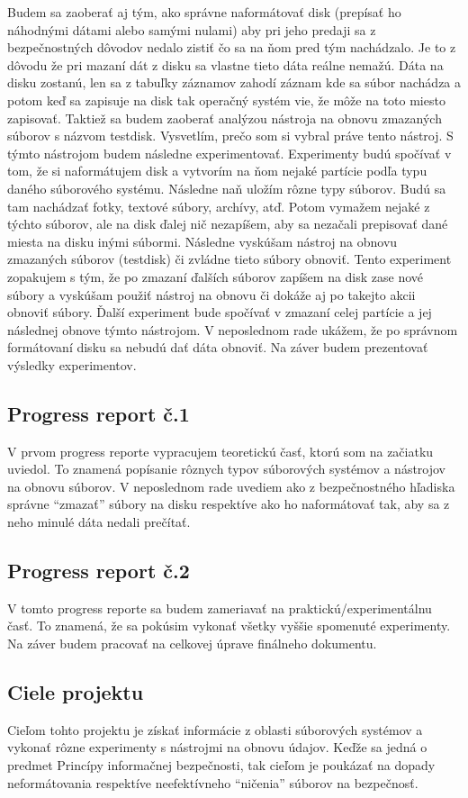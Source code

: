 \documentclass[12pt,oneside,slovak,a4paper]{article}
\begin{document}
Budem sa zaoberať aj tým, ako správne naformátovať disk (prepísať ho náhodnými dátami alebo samými nulami) aby pri jeho predaji sa z bezpečnostných dôvodov nedalo zistiť čo sa na ňom pred tým nachádzalo. Je to z dôvodu že pri mazaní dát z disku sa vlastne tieto dáta reálne nemažú. Dáta na disku zostanú, len sa z tabuľky záznamov zahodí záznam kde sa súbor nachádza a potom keď sa zapisuje na disk tak operačný systém vie, že môže na toto miesto zapisovať. Taktiež sa budem zaoberať analýzou nástroja na obnovu zmazaných súborov s názvom testdisk\cite{TSDK}. Vysvetlím, prečo som si vybral práve tento nástroj. S týmto nástrojom budem následne experimentovať. Experimenty budú spočívať v tom, že si naformátujem disk a vytvorím na ňom nejaké partície podľa typu daného súborového systému. Následne naň uložím rôzne typy súborov. Budú sa tam nachádzať fotky, textové súbory, archívy, atď. Potom vymažem nejaké z týchto súborov, ale na disk ďalej nič nezapíšem, aby sa nezačali prepisovať dané miesta na disku inými súbormi. Následne vyskúšam nástroj na obnovu zmazaných súborov (testdisk) či zvládne tieto súbory obnoviť. Tento experiment zopakujem s tým, že po zmazaní ďalších súborov zapíšem na disk zase nové súbory a vyskúšam použiť nástroj na obnovu či dokáže aj po takejto akcii obnoviť súbory. Ďalší experiment bude spočívať v zmazaní celej partície a jej následnej obnove týmto nástrojom. V neposlednom rade ukážem, že po správnom formátovaní disku sa nebudú dať dáta obnoviť. Na záver budem prezentovať výsledky experimentov.
\subsection{Progress report č.1}
V prvom progress reporte vypracujem teoretickú časť, ktorú som na začiatku uviedol. To znamená popísanie rôznych typov súborových systémov a nástrojov na obnovu súborov. V neposlednom rade uvediem ako z bezpečnostného hľadiska správne ``zmazať'' súbory na disku respektíve ako ho naformátovať tak, aby sa z neho minulé dáta nedali prečítať.

\subsection{Progress report č.2}
V tomto progress reporte sa budem zameriavať na praktickú/experimentálnu časť. To znamená, že sa pokúsim vykonať všetky vyššie spomenuté experimenty. Na záver budem pracovať na celkovej úprave finálneho dokumentu.

\subsection{Ciele projektu}
Cieľom tohto projektu je získať informácie z oblasti súborových systémov a vykonať rôzne experimenty s nástrojmi na obnovu údajov. Keďže sa jedná o predmet Princípy informačnej bezpečnosti, tak cieľom je poukázať na dopady neformátovania respektíve neefektívneho ``ničenia'' súborov na bezpečnosť.
\end{document}
